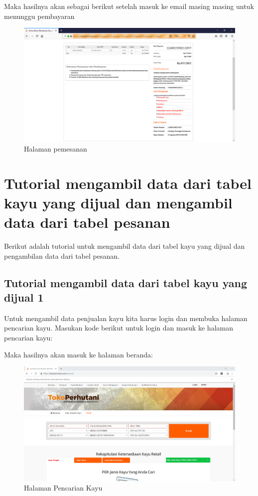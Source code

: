 \newpage
Maka hasilnya akan sebagai berikut setelah masuk 
ke email masing masing untuk menunggu pembayaran
\begin{figure}[h]
	\centering
	\includegraphics[scale=0.25]{figures/email1}
	\caption{Halaman pemesanan}
\end{figure}

\newpage
\section{Tutorial mengambil data dari tabel kayu yang dijual dan mengambil data dari tabel pesanan}
Berikut adalah tutorial untuk  mengambil data dari tabel kayu yang dijual dan pengambilan data dari tabel pesanan. 

\subsection{Tutorial mengambil data dari tabel kayu yang dijual 1}
Untuk mengambil data penjualan kayu kita harus login dan membuka halaman pencarian kayu.
Masukan kode berikut untuk login dan masuk ke halaman pencarian kayu:

\newpage
Maka hasilnya akan masuk ke halaman beranda:
\begin{figure}[h]
	\centering
	\includegraphics[scale=0.30]{figures/7beranda}
	\caption{Halaman Pencarian Kayu}
\end{figure}

